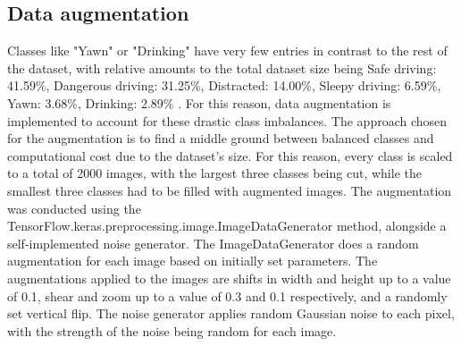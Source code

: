 \subsection{Data augmentation}
Classes like "Yawn" or "Drinking" have very few entries in contrast to the rest of the dataset, with relative amounts to the total dataset size being 
Safe driving: 41.59\%,
Dangerous driving: 31.25\%,
Distracted: 14.00\%,
Sleepy driving: 6.59\%,
Yawn: 3.68\%,
Drinking: 2.89\% .
For this reason, data augmentation is implemented to account for these drastic class imbalances.
The approach chosen for the augmentation is to find a middle ground between balanced classes and computational cost due to the dataset's size. For this reason, every class is scaled to a total of 2000 images, with the largest three classes being cut, while the smallest three classes had to be filled with augmented images. 
The augmentation was conducted using the TensorFlow.keras.preprocessing.image.ImageDataGenerator method, alongside a self-implemented noise generator. The ImageDataGenerator does a random augmentation for each image based on initially set parameters. The augmentations applied to the images are shifts in width and height up to a value of 0.1, shear and zoom up to a value of 0.3 and 0.1 respectively, and a randomly set vertical flip. The noise generator applies random Gaussian noise to each pixel, with the strength of the noise being random for each image.
